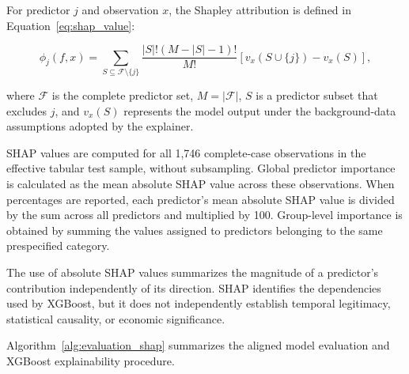 \documentclass[utf8]{FrontiersinHarvard} %
\begin{document}
For predictor \(j\) and observation \(x\), the Shapley attribution is defined in Equation~\ref{eq:shap_value}:

\begin{equation}
	\phi_j(f,x)
	=
	\sum_{S\subseteq\mathcal{F}\setminus\{j\}}
	\frac{
		|S|!\left(M-|S|-1\right)!
	}{
		M!
	}
	\left[
	v_x\left(S\cup\{j\}\right)-v_x(S)
	\right],
	\label{eq:shap_value}
\end{equation}

where \(\mathcal{F}\) is the complete predictor set, \(M=|\mathcal{F}|\), \(S\) is a predictor subset that excludes \(j\), and \(v_x(S)\) represents the model output under the background-data assumptions adopted by the explainer.

SHAP values are computed for all 1,746 complete-case observations in the effective tabular test sample, without subsampling. Global predictor importance is calculated as the mean absolute SHAP value across these observations. When percentages are reported, each predictor's mean absolute SHAP value is divided by the sum across all predictors and multiplied by 100. Group-level importance is obtained by summing the values assigned to predictors belonging to the same prespecified category.

The use of absolute SHAP values summarizes the magnitude of a predictor's contribution independently of its direction. SHAP identifies the dependencies used by XGBoost, but it does not independently establish temporal legitimacy, statistical causality, or economic significance.

Algorithm~\ref{alg:evaluation_shap} summarizes the aligned model evaluation and XGBoost explainability procedure.
\end{document}
